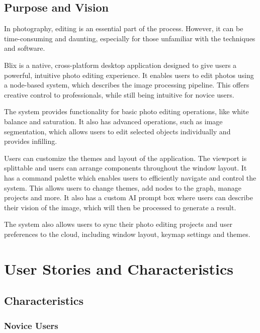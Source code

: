 \documentclass[11pt,a4paper]{article}
\begin{document}
\subsection*{Purpose and Vision}

In photography, editing is an essential part of the process. However, it can be
time-consuming and daunting, especially for those unfamiliar with the techniques
and software. 

Blix is a native, cross-platform desktop application designed to give users a
powerful, intuitive photo editing experience. It enables users to edit photos 
using a node-based system, which describes the image processing pipeline. This
offers creative control to professionals, while still being intuitive for 
novice users.

The system provides functionality for basic photo editing operations, like white
balance and saturation. It also has advanced operations, such as image
segmentation, which allows users to edit selected objects individually and
provides infilling. 

Users can customize the themes and layout of the application. The viewport is
splittable and users can arrange components throughout the window layout. It has
a command palette which enables users to efficiently navigate and control the
system. This allows users to change themes, add nodes to the graph, manage
projects and more. It also has a custom AI prompt box where users can describe
their vision of the image, which will then be processed to generate a result.

The system also allows users to sync their photo editing projects and user
preferences to the cloud, including window layout, keymap settings and themes.

\pagebreak


\section*{User Stories and Characteristics}

\subsection*{Characteristics}

\subsubsection*{Novice Users}
\end{document}
